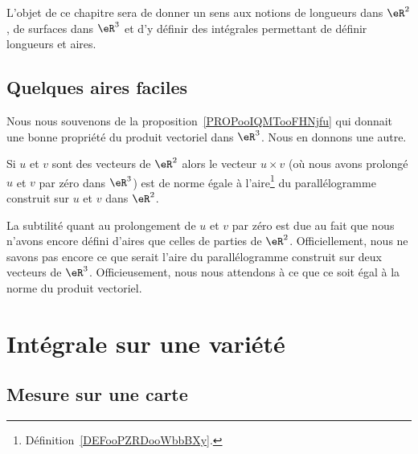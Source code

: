 L'objet de ce chapitre sera de donner un sens aux notions de longueurs dans \( \eR^2\), de surfaces dans \( \eR^3\) et d'y définir des intégrales permettant de définir longueurs et aires.

\subsection{Quelques aires faciles}

Nous nous souvenons de la proposition~\ref{PROPooIQMTooFHNjfu} qui donnait une bonne propriété du produit vectoriel dans \( \eR^3\). Nous en donnons une autre.

\begin{proposition}
    Si \( u\) et \( v\) sont des vecteurs de \( \eR^2\) alors le vecteur \( u\times v\) (où nous avons prolongé \( u\) et \( v\) par zéro dans \( \eR^3\)) est de norme égale à l'aire\footnote{Définition~\ref{DEFooPZRDooWbbBXy}.} du parallélogramme construit sur \( u\) et \( v\) dans \( \eR^2\).
\end{proposition}

La subtilité quant au prolongement de \( u\) et \( v\) par zéro est due au fait que nous n'avons encore défini d'aires que celles de parties de \( \eR^2\). Officiellement, nous ne savons pas encore ce que serait l'aire du parallélogramme construit sur deux vecteurs de \( \eR^3\). Officieusement, nous nous attendons à ce que ce soit égal à la norme du produit vectoriel.

\section{Intégrale sur une variété}

\subsection{Mesure sur une carte}

